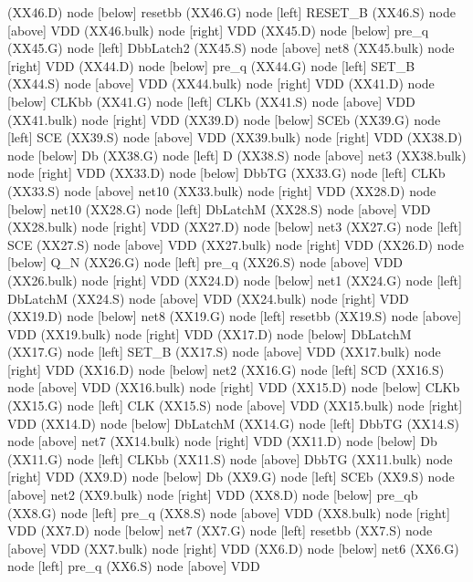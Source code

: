 \begin{circuitikz}[american]

\iffalse
	(XX46.D) node [below]	{resetbb}
	(XX46.G) node [left]	{RESET\_B}
	(XX46.S) node [above]	{VDD}
	(XX46.bulk) node [right]	{VDD}
	(XX45.D) node [below]	{pre\_q}
	(XX45.G) node [left]	{DbbLatch2}
	(XX45.S) node [above]	{net8}
	(XX45.bulk) node [right]	{VDD}
	(XX44.D) node [below]	{pre\_q}
	(XX44.G) node [left]	{SET\_B}
	(XX44.S) node [above]	{VDD}
	(XX44.bulk) node [right]	{VDD}
	(XX41.D) node [below]	{CLKbb}
	(XX41.G) node [left]	{CLKb}
	(XX41.S) node [above]	{VDD}
	(XX41.bulk) node [right]	{VDD}
	(XX39.D) node [below]	{SCEb}
	(XX39.G) node [left]	{SCE}
	(XX39.S) node [above]	{VDD}
	(XX39.bulk) node [right]	{VDD}
	(XX38.D) node [below]	{Db}
	(XX38.G) node [left]	{D}
	(XX38.S) node [above]	{net3}
	(XX38.bulk) node [right]	{VDD}
	(XX33.D) node [below]	{DbbTG}
	(XX33.G) node [left]	{CLKb}
	(XX33.S) node [above]	{net10}
	(XX33.bulk) node [right]	{VDD}
	(XX28.D) node [below]	{net10}
	(XX28.G) node [left]	{DbLatchM}
	(XX28.S) node [above]	{VDD}
	(XX28.bulk) node [right]	{VDD}
	(XX27.D) node [below]	{net3}
	(XX27.G) node [left]	{SCE}
	(XX27.S) node [above]	{VDD}
	(XX27.bulk) node [right]	{VDD}
	(XX26.D) node [below]	{Q\_N}
	(XX26.G) node [left]	{pre\_q}
	(XX26.S) node [above]	{VDD}
	(XX26.bulk) node [right]	{VDD}
	(XX24.D) node [below]	{net1}
	(XX24.G) node [left]	{DbLatchM}
	(XX24.S) node [above]	{VDD}
	(XX24.bulk) node [right]	{VDD}
	(XX19.D) node [below]	{net8}
	(XX19.G) node [left]	{resetbb}
	(XX19.S) node [above]	{VDD}
	(XX19.bulk) node [right]	{VDD}
	(XX17.D) node [below]	{DbLatchM}
	(XX17.G) node [left]	{SET\_B}
	(XX17.S) node [above]	{VDD}
	(XX17.bulk) node [right]	{VDD}
	(XX16.D) node [below]	{net2}
	(XX16.G) node [left]	{SCD}
	(XX16.S) node [above]	{VDD}
	(XX16.bulk) node [right]	{VDD}
	(XX15.D) node [below]	{CLKb}
	(XX15.G) node [left]	{CLK}
	(XX15.S) node [above]	{VDD}
	(XX15.bulk) node [right]	{VDD}
	(XX14.D) node [below]	{DbLatchM}
	(XX14.G) node [left]	{DbbTG}
	(XX14.S) node [above]	{net7}
	(XX14.bulk) node [right]	{VDD}
	(XX11.D) node [below]	{Db}
	(XX11.G) node [left]	{CLKbb}
	(XX11.S) node [above]	{DbbTG}
	(XX11.bulk) node [right]	{VDD}
	(XX9.D) node [below]	{Db}
	(XX9.G) node [left]	{SCEb}
	(XX9.S) node [above]	{net2}
	(XX9.bulk) node [right]	{VDD}
	(XX8.D) node [below]	{pre\_qb}
	(XX8.G) node [left]	{pre\_q}
	(XX8.S) node [above]	{VDD}
	(XX8.bulk) node [right]	{VDD}
	(XX7.D) node [below]	{net7}
	(XX7.G) node [left]	{resetbb}
	(XX7.S) node [above]	{VDD}
	(XX7.bulk) node [right]	{VDD}
	(XX6.D) node [below]	{net6}
	(XX6.G) node [left]	{pre\_q}
	(XX6.S) node [above]	{VDD}

\end{circuitikz}
